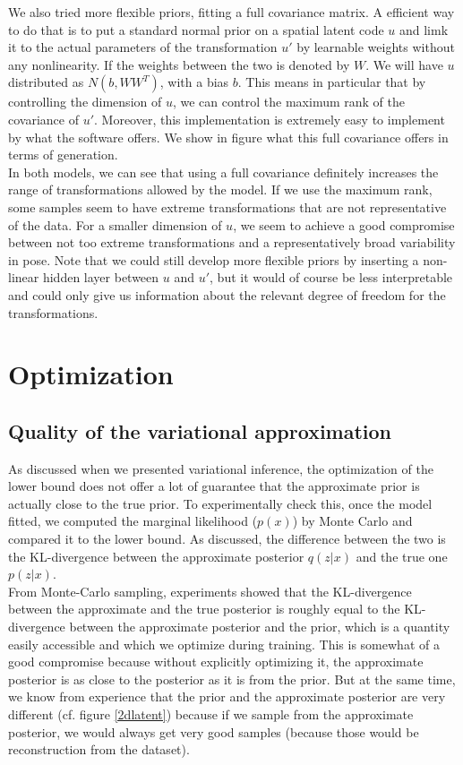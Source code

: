 \documentclass[letterpaper, twoside]{article}
\begin{document}
    We also tried more flexible priors, fitting a full covariance matrix. A efficient way to do that is to put a standard normal prior on a spatial latent code $u$ and limk it to the actual parameters of the transformation $u'$ by learnable weights without any nonlinearity. If the weights between the two is denoted by $W$. We will have $u$ distributed as $N(b, WW^T)$, with a bias $b$. This means in particular that by controlling the dimension of $u$, we can control the maximum rank of the covariance of $u'$. Moreover, this implementation is extremely easy to implement by what the software offers. We show in figure  what this full covariance offers in terms of generation.\\

  In both models, we can see that using a full covariance definitely increases the range of transformations allowed by the model. If we use the maximum rank, some samples seem to have extreme transformations that are not representative of the data. For a smaller dimension of $u$, we seem to achieve a good compromise between not too extreme transformations and a representatively broad variability in pose. Note that we could still develop more flexible priors by inserting a non-linear hidden layer between $u$ and $u'$, but it would of course be less interpretable and could only give us information about the relevant degree of freedom for the transformations.

\section{Optimization}
\subsection{Quality of the variational approximation}
  As discussed when we presented variational inference, the optimization of the lower bound does not offer a lot of guarantee that the approximate prior is actually close to the true prior. To experimentally check this, once the model fitted, we computed the marginal likelihood ($p(x)$) by Monte Carlo and compared it to the lower bound. As discussed, the difference between the two is the KL-divergence between the approximate posterior $q(z|x)$ and the true one $p(z|x)$.\\

  From Monte-Carlo sampling, experiments showed that the KL-divergence between the approximate and the true posterior is roughly equal to the KL-divergence between the approximate posterior and the prior, which is a quantity easily accessible and which we optimize during training. This is somewhat of a good compromise because without explicitly optimizing it, the approximate posterior is as close to the posterior as it is from the prior. But at the same time, we know from experience that the prior and the approximate posterior are very different (cf. figure \ref{2dlatent}) because if we sample from the approximate posterior, we would always get very good samples (because those would be reconstruction from the dataset).
\end{document}

